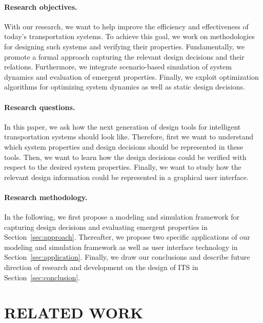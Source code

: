 \documentclass[a4paper,twoside]{article}
\begin{document}
	\paragraph{Research objectives.}
	
	With our research, we want to help improve the efficiency and effectiveness of today's transportation systems.
	To achieve this goal, we work on methodologies for designing such systems and verifying their properties.
	Fundamentally, we promote a formal approach capturing the relevant design decisions and their relations.
	Furthermore, we integrate scenario-based simulation of system dynamics and evaluation of emergent properties.
	Finally, we exploit optimization algorithms for optimizing system dynamics as well as static design decisions.
	
	\paragraph{Research questions.}
	
	In this paper, we ask how the next generation of design tools for intelligent transportation systems should look like.
	Therefore, first we want to understand which system properties and design decisions should be represented in these tools.
	Then, we want to learn how the design decisions could be verified with respect to the desired system properties.
	Finally, we want to study how the relevant design information could be represented in a graphical user interface.
	
	\paragraph{Research methodology.}
	
	In the following, we first propose a modeling and simulation framework for capturing design decisions and evaluating emergent properties in Section~\ref{sec:approach}.
	Thereafter, we propose two specific applications of our modeling and simulation framework as well as user interface technology in Section~\ref{sec:application}.
	Finally, we draw our conclusions and describe future direction of research and development on the design of ITS in Section~\ref{sec:conclusion}. 
	
	\section{\uppercase{Related work}}
\end{document}
